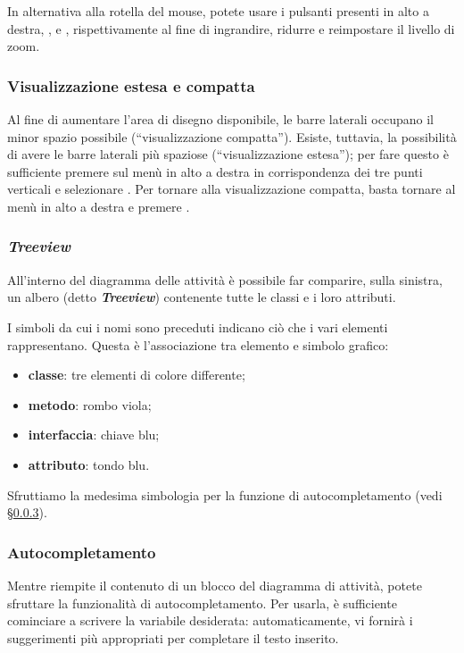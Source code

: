 In alternativa alla rotella del mouse, potete usare i pulsanti presenti in alto a destra, \click{+}, \click{-} e , rispettivamente al fine di ingrandire, ridurre e reimpostare il livello di zoom.

\subsubsection{Visualizzazione estesa e compatta}
Al fine di aumentare l'area di disegno disponibile, le barre laterali occupano il minor spazio possibile (“visualizzazione compatta”). Esiste, tuttavia, la possibilità di avere le barre laterali più spaziose (“visualizzazione estesa”); per fare questo è sufficiente premere sul menù in alto a destra in corrispondenza dei tre punti verticali e selezionare . Per tornare alla visualizzazione compatta, basta tornare al menù in alto a destra e premere .

\subsubsection{\emph{Treeview}}
All'interno del diagramma delle attività è possibile far comparire, sulla sinistra, un albero (detto \textbf{\emph{Treeview}}) contenente tutte le classi e i loro attributi.

I simboli da cui i nomi sono preceduti indicano ciò che i vari elementi rappresentano. Questa è l'associazione tra elemento e simbolo grafico:
\begin{itemize}
	\item \textbf{classe}: tre elementi di colore differente;
	\item \textbf{metodo}: rombo viola;
	\item \textbf{interfaccia}: chiave blu;
	\item \textbf{attributo}: tondo blu.
\end{itemize}

Sfruttiamo la medesima simbologia per la funzione di autocompletamento (vedi §\ref{sec:autocomplete}).

\subsubsection{Autocompletamento} \label{sec:autocomplete}
Mentre riempite il contenuto di un blocco del diagramma di attività, potete sfruttare la funzionalità di autocompletamento. Per usarla, è sufficiente cominciare a scrivere la variabile desiderata: automaticamente, \proj{} vi fornirà i suggerimenti più appropriati per completare il testo inserito.



